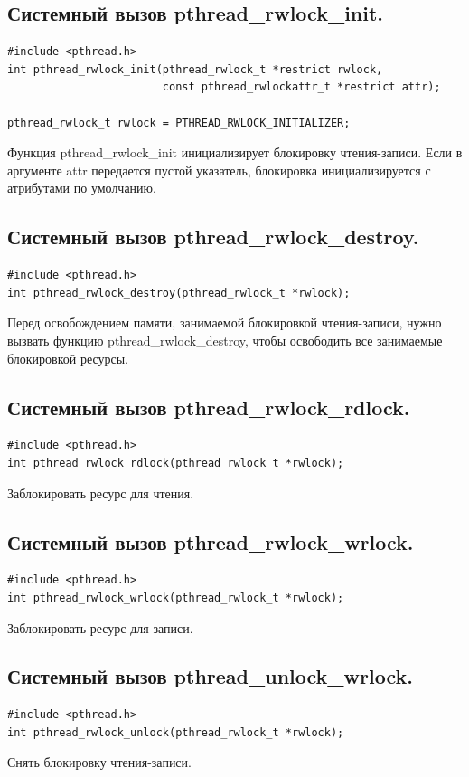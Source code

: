 \documentclass[a4paper]{article}
\begin{document}
\subsection{\Large Системный вызов pthread\_rwlock\_init.}
\begin{verbatim}
#include <pthread.h>
int pthread_rwlock_init(pthread_rwlock_t *restrict rwlock, 
                        const pthread_rwlockattr_t *restrict attr);
                        
pthread_rwlock_t rwlock = PTHREAD_RWLOCK_INITIALIZER;
\end{verbatim}
Функция pthread\_rwlock\_init инициализирует блокировку чтения-записи. Если в аргументе attr передается пустой указатель, блокировка инициализируется с атрибутами по умолчанию.

\subsection{\Large Системный вызов pthread\_rwlock\_destroy.}
\begin{verbatim}
#include <pthread.h>
int pthread_rwlock_destroy(pthread_rwlock_t *rwlock);
\end{verbatim}
Перед освобождением памяти, занимаемой блокировкой чтения-записи, нужно вызвать функцию pthread\_rwlock\_destroy, чтобы освободить все занимаемые блокировкой ресурсы.

\subsection{\Large Системный вызов pthread\_rwlock\_rdlock.}
\begin{verbatim}
#include <pthread.h>
int pthread_rwlock_rdlock(pthread_rwlock_t *rwlock);
\end{verbatim}
Заблокировать ресурс для чтения.

\subsection{\Large Системный вызов pthread\_rwlock\_wrlock.}
\begin{verbatim}
#include <pthread.h>
int pthread_rwlock_wrlock(pthread_rwlock_t *rwlock);
\end{verbatim}
Заблокировать ресурс для записи.

\subsection{\Large Системный вызов pthread\_unlock\_wrlock.}
\begin{verbatim}
#include <pthread.h>
int pthread_rwlock_unlock(pthread_rwlock_t *rwlock);
\end{verbatim}
Снять блокировку чтения-записи.
\end{document}
